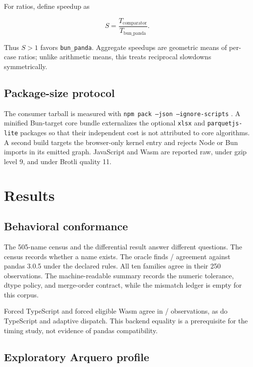\documentclass[pdflatex,sn-basic,Numbered]{sn-jnl}
\begin{document}
For ratios, define speedup as

\begin{equation}
S = \frac{T_{\mathrm{comparator}}}{T_{\mathrm{bun\_panda}}}.
\end{equation}

Thus $S>1$ favors \texttt{bun\_panda}. Aggregate speedups are geometric means of per-case ratios; unlike arithmetic means, this treats reciprocal slowdowns symmetrically.

\subsection{Package-size protocol}

The consumer tarball is measured with \texttt{npm pack --json --ignore-scripts} \cite{npmPack}. A minified Bun-target core bundle externalizes the optional \texttt{xlsx} and \texttt{parquetjs-lite} packages so that their independent cost is not attributed to core algorithms. A second build targets the browser-only kernel entry and rejects Node or Bun imports in its emitted graph. JavaScript and Wasm are reported raw, under gzip level 9, and under Brotli quality 11.

\section{Results}\label{sec:results}

\subsection{Behavioral conformance}

The 505-name census and the differential result answer different questions. The census records whether a name exists. The oracle finds \ConformancePasses{}/\ConformanceCases{} agreement against pandas 3.0.5 under the declared rules. All ten families agree in their 250 observations. The machine-readable summary records the numeric tolerance, dtype policy, and merge-order contract, while the mismatch ledger is empty for this corpus.

Forced TypeScript and forced eligible Wasm agree in \BackendPasses{}/\BackendCases{} observations, as do TypeScript and adaptive dispatch. This backend equality is a prerequisite for the timing study, not evidence of pandas compatibility.

\subsection{Exploratory Arquero profile}
\end{document}
